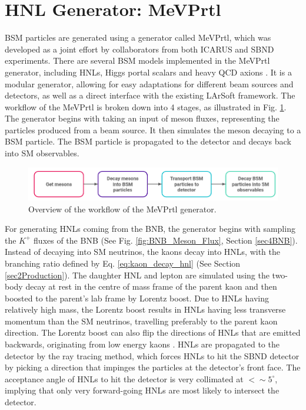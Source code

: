 \section{HNL Generator: MeVPrtl}
\label{sec:gen_mevprtl}

BSM particles are generated using a generator called MeVPrtl, which was developed as a joint effort by collaborators from both ICARUS and SBND experiments.
There are several BSM models implemented in the MeVPrtl generator, including HNLs, Higgs portal scalars \cite{higgs_scalar} and heavy QCD axions \cite{qcd_axion}.
It is a modular generator, allowing for easy adaptations for different beam sources and detectors, as well as a direct interface with the existing LArSoft framework.
The workflow of the MeVPrtl is broken down into 4 stages, as illustrated in Fig. \ref{fig:MeVPrtl_Workflow}.
The generator begins with taking an input of meson fluxes, representing the particles produced from a beam source.
It then simulates the meson decaying to a BSM particle.
The BSM particle is propagated to the detector and decays back into SM observables.

\begin{figure}[htbp!] 
\centering    
\includegraphics[width=1.0\textwidth]{MeVPrtl_Workflow}
\caption[MeVPrtl Generator Workflow]{
Overview of the workflow of the MeVPrtl generator.
}
\label{fig:MeVPrtl_Workflow}
\end{figure}

For generating HNLs coming from the BNB, the generator begins with sampling the $K^{+}$ fluxes of the BNB (See Fig. \ref{fig:BNB_Meson_Flux}, Section \ref{sec4BNB}).
Instead of decaying into SM neutrinos, the kaons decay into HNLs, with the branching ratio defined by Eq. \ref{eq:kaon_decay_hnl} (See Section \ref{sec2Production}).
The daughter HNL and lepton are simulated using the two-body decay at rest in the centre of mass frame of the parent kaon and then boosted to the parent's lab frame by Lorentz boost.
Due to HNLs having relatively high mass, the Lorentz boost results in HNLs having less transverse momentum than the SM neutrinos, travelling preferably to the parent kaon direction.
The Lorentz boost can also flip the directions of HNLs that are emitted backwards, originating from low energy kaons \cite{DavidePhD}.
HNLs are propagated to the detector by the ray tracing method, which forces HNLs to hit the SBND detector by picking a direction that impinges the particles at the detector's front face.  
The acceptance angle of HNLs to hit the detector is very collimated at $< \sim 5^\circ$, implying that only very forward-going HNLs are most likely to intersect the detector.

